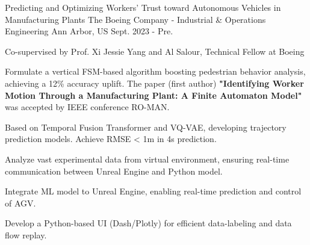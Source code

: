 

\begin{cventries}
  \begin{cventry}
    {Predicting and Optimizing Workers’ Trust toward Autonomous Vehicles in Manufacturing Plants}
    {The Boeing Company - Industrial \& Operations Engineering}
    {Ann Arbor, US}
    {Sept. 2023 - Pre.}
    {
      \begin{cvitems}
      \item {Co-supervised by Prof. Xi Jessie Yang and Al Salour, Technical Fellow at Boeing}
      \item {Formulate a vertical FSM-based algorithm boosting pedestrian behavior analysis, achieving a 12\% accuracy uplift.
      The paper (first author) \textbf{"Identifying Worker Motion Through a Manufacturing Plant: A Finite Automaton Model"} was accepted by IEEE conference RO-MAN.}
      \item {Based on Temporal Fusion Transformer and VQ-VAE, developing trajectory prediction models. Achieve RMSE < 1m in 4s prediction.}
      \item {Analyze vast experimental data from virtual environment, ensuring real-time communication between Unreal Engine and Python model.}
      \item {Integrate ML model to Unreal Engine, enabling real-time prediction and control of AGV. }
      \item {Develop a Python-based UI (Dash/Plotly) for efficient data-labeling and data flow replay.}
    \end{cvitems}
    }
  
  \end{cventry}


\end{cventries}
